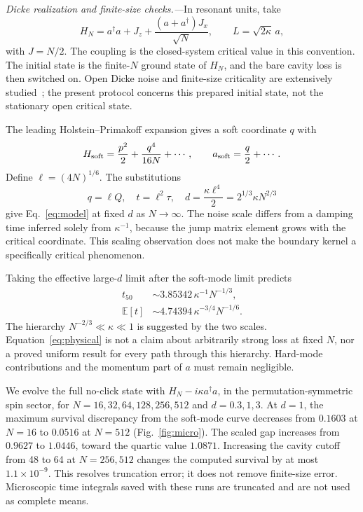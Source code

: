 \documentclass[aps,prl,reprint,superscriptaddress,nofootinbib]{revtex4-2}
\newcommand{\E}{\mathbb E}
\begin{document}
\emph{Dicke realization and finite-size checks.---}In resonant units, take
\begin{equation}
 H_N=a^\dagger a+J_z+\frac{(a+a^\dagger)J_x}{\sqrt N},
 \qquad L=\sqrt{2\kappa}\,a,
 \label{eq:dicke}
\end{equation}
with $J=N/2$. The coupling is the closed-system critical value in this convention. The initial state is the finite-$N$ ground state of $H_N$, and the bare cavity loss is then switched on. Open Dicke noise and finite-size criticality are extensively studied~\cite{DallaTorre,LiWang}; the present protocol concerns this prepared initial state, not the stationary open critical state.

The leading Holstein--Primakoff expansion gives a soft coordinate $q$ with
\begin{equation}
 H_{\rm soft}=\frac{p^2}{2}+\frac{q^4}{16N}+\cdots,
 \qquad a_{\rm soft}=\frac q2+\cdots.
\end{equation}
Define $\ell=(4N)^{1/6}$. The substitutions
\begin{equation}
 q=\ell Q,\quad t=\ell^2\tau,\quad
 d=\frac{\kappa\ell^4}{2}=2^{1/3}\kappa N^{2/3}
 \label{eq:mapping}
\end{equation}
give Eq.~\eqref{eq:model} at fixed $d$ as $N\to\infty$.
The noise scale differs from a damping time inferred solely from $\kappa^{-1}$, because the jump matrix element grows with the critical coordinate. This scaling observation does not make the boundary kernel a specifically critical phenomenon.

Taking the effective large-$d$ limit after the soft-mode limit predicts
\begin{align}
 t_{50}&\sim3.85342\,\kappa^{-1}N^{-1/3},\\
 \E[t]&\sim4.74394\,\kappa^{-3/4}N^{-1/6}.
 \label{eq:physical}
\end{align}
The hierarchy $N^{-2/3}\ll\kappa\ll1$ is suggested by the two scales. Equation~\eqref{eq:physical} is not a claim about arbitrarily strong loss at fixed $N$, nor a proved uniform result for every path through this hierarchy. Hard-mode contributions and the momentum part of $a$ must remain negligible.

We evolve the full no-click state with $H_N-i\kappa a^\dagger a$, in the permutation-symmetric spin sector, for $N=16,32,64,128,256,512$ and $d=0.3,1,3$. At $d=1$, the maximum survival discrepancy from the soft-mode curve decreases from $0.1603$ at $N=16$ to $0.0516$ at $N=512$ (Fig.~\ref{fig:micro}). The scaled gap increases from $0.9627$ to $1.0446$, toward the quartic value $1.0871$. Increasing the cavity cutoff from 48 to 64 at $N=256,512$ changes the computed survival by at most $1.1\times10^{-9}$. This resolves truncation error; it does not remove finite-size error. Microscopic time integrals saved with these runs are truncated and are not used as complete means.
\end{document}
